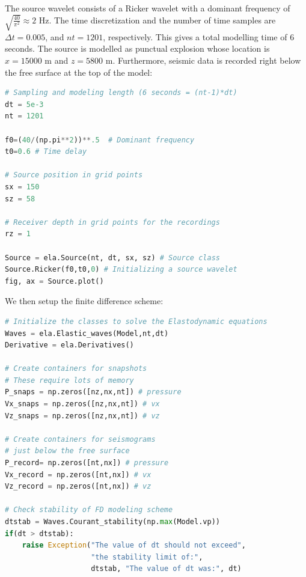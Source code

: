 \documentclass[a4paper , 12pt]{book}
\begin{document}
The source wavelet consists of a Ricker wavelet with a dominant frequency of $\sqrt{\frac{40}{\pi^2}} \approx 2$ Hz. The time discretization and  the number of time samples are $\Delta t = 0.005$, and $nt = 1201$, respectively. This gives a total modelling time of 6 seconds. The source is modelled as punctual explosion whose location is $x = 15000$ m and $z=5800$ m. Furthermore, seismic data is recorded right below the free surface at the top of the model:

\begin{center}
\begin{lstlisting}[language=Python, frame=single]
# Sampling and modeling length (6 seconds = (nt-1)*dt)
dt = 5e-3
nt = 1201

f0=(40/(np.pi**2))**.5  # Dominant frequency
t0=0.6 # Time delay

# Source position in grid points
sx = 150
sz = 58

# Receiver depth in grid points for the recordings
rz = 1

Source = ela.Source(nt, dt, sx, sz) # Source class
Source.Ricker(f0,t0,0) # Initializing a source wavelet
fig, ax = Source.plot()
\end{lstlisting}
\end{center}

We then setup the finite difference scheme:

\begin{lstlisting}[language=Python, frame=single]
# Initialize the classes to solve the Elastodynamic equations
Waves = ela.Elastic_waves(Model,nt,dt) 
Derivative = ela.Derivatives()

# Create containers for snapshots 
# These require lots of memory
P_snaps = np.zeros([nz,nx,nt]) # pressure
Vx_snaps = np.zeros([nz,nx,nt]) # vx
Vz_snaps = np.zeros([nz,nx,nt]) # vz

# Create containers for seismograms
# just below the free surface
P_record= np.zeros([nt,nx]) # pressure
Vx_record = np.zeros([nt,nx]) # vx 
Vz_record = np.zeros([nt,nx]) # vz

# Check stability of FD modeling scheme
dtstab = Waves.Courant_stability(np.max(Model.vp))
if(dt > dtstab):
    raise Exception("The value of dt should not exceed", 
                    "the stability limit of:", 
                    dtstab, "The value of dt was:", dt)
\end{lstlisting}
\end{document}
